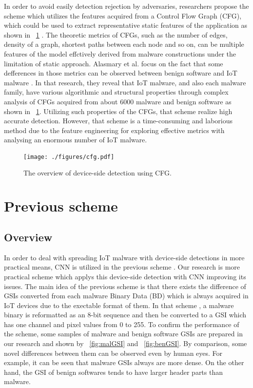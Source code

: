 \documentclass{ieeeaccess}
\begin{document}
In order to avoid easily detection rejection by adversaries, researchers propose the scheme which utilizes the features acquired from a Control Flow Graph (CFG), which could be used to extract representative static features of the application as shown in \figurename~\ref{fig:cfg} \cite{cfg, cfg2}.
The theoretic metrics of CFGs, such as the number of edges, density of a graph, shortest paths between each node and so on, can be multiple features of the model effctively derived from malware constructions under the limitation of static approach.
Alasmary et al. focus on the fact that some defferences in those metrics can be observed between benign software and IoT malware \cite{cfg}.
In that research, they reveal that IoT malware, and also each malware family, have various algorithmic and structural properties through complex analysis of CFGs acquired from about 6000 malware and benign software as shown in \figurename~\ref{fig:cfg}. 
Utilizing such properties of the CFGs, that scheme realize high accurate detection.
However, that scheme is a time-consuming and laborious method due to the feature engineering for exploring effective metrics with analysing an enormous number of IoT malware.

\begin{figure}[t]
 \centering
 \texttt{[image: ./figures/cfg.pdf]}
 \caption{The overview of device-side detection using CFG.} 
 \label{fig:cfg}
\end{figure}

\section{Previous scheme} \label{sec:previous_scheme}
\subsection{Overview} 
In order to deal with spreading IoT malware with device-side detections in more practical means, CNN is utilized in the previous scheme \cite{previous}.
Our research is more practical scheme which applys this device-side detection with CNN improving its issues.
The main idea of the previous scheme is that there exists the difference of GSIs converted from each malware Binary Data (BD) which is always acquired in IoT devices due to the exectable format of them.
In that scheme \cite{previous}, a malware binary is reformatted as an 8-bit sequence and then be converted to a GSI which has one channel and pixel values from 0 to 255.
To confirm the performance of the scheme, some samples of malware and benign software GSIs are prepared in our research and shown by \figurename~\ref{fig:malGSI} and \figurename~\ref{fig:benGSI}.
By comparison, some novel differences between them can be observed even by human eyes.
For example, it can be seen that malware GSIs always are more dense.
On the other hand, the GSI of benign softwares tends to have larger header parts than malware.
\end{document}
